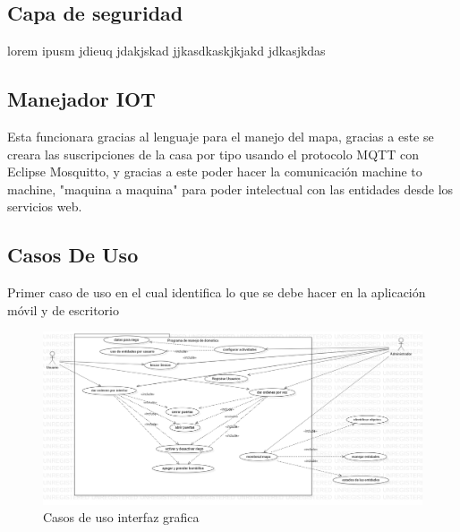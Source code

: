 \subsection{Capa de seguridad}
lorem ipusm jdieuq jdakjskad jjkasdkaskjkjakd jdkasjkdas
\subsection{Manejador IOT}
Esta funcionara gracias al lenguaje para el manejo del mapa, gracias a este se creara las suscripciones de la casa por tipo usando el protocolo MQTT con Eclipse Mosquitto, y gracias a este poder hacer la comunicación machine to machine, "maquina a maquina" para poder intelectual con las entidades desde los servicios web.
\subsection{Casos De Uso}
Primer caso de uso en el cual identifica lo que se debe hacer en la aplicación móvil y de escritorio\\
\begin{figure}
  \includegraphics[width=\linewidth]{staruml/img/caso-de-uso-1.png}
  \caption{Casos de uso interfaz grafica}
  \label{fig:Casos de uso para manejo de cliente}
\end{figure}\\